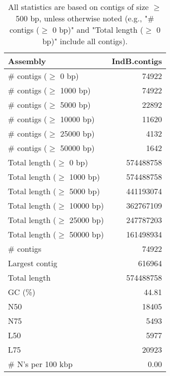 \documentclass[12pt,a4paper]{article}
\begin{document}
\begin{table}[ht]
\begin{center}
\caption{All statistics are based on contigs of size $\geq$ 500 bp, unless otherwise noted (e.g., "\# contigs ($\geq$ 0 bp)" and "Total length ($\geq$ 0 bp)" include all contigs).}
\begin{tabular}{|l*{1}{|r}|}
\hline
Assembly & IndB.contigs \\ \hline
\# contigs ($\geq$ 0 bp) & 74922 \\ \hline
\# contigs ($\geq$ 1000 bp) & 74922 \\ \hline
\# contigs ($\geq$ 5000 bp) & 22892 \\ \hline
\# contigs ($\geq$ 10000 bp) & 11620 \\ \hline
\# contigs ($\geq$ 25000 bp) & 4132 \\ \hline
\# contigs ($\geq$ 50000 bp) & 1642 \\ \hline
Total length ($\geq$ 0 bp) & 574488758 \\ \hline
Total length ($\geq$ 1000 bp) & 574488758 \\ \hline
Total length ($\geq$ 5000 bp) & 441193074 \\ \hline
Total length ($\geq$ 10000 bp) & 362767109 \\ \hline
Total length ($\geq$ 25000 bp) & 247787203 \\ \hline
Total length ($\geq$ 50000 bp) & 161498934 \\ \hline
\# contigs & 74922 \\ \hline
Largest contig & 616964 \\ \hline
Total length & 574488758 \\ \hline
GC (\%) & 44.81 \\ \hline
N50 & 18405 \\ \hline
N75 & 5493 \\ \hline
L50 & 5977 \\ \hline
L75 & 20923 \\ \hline
\# N's per 100 kbp & 0.00 \\ \hline
\end{tabular}
\end{center}
\end{table}
\end{document}
